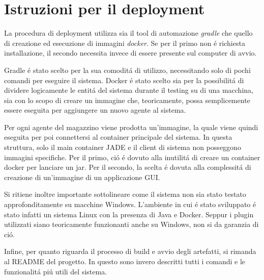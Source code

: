 \section{Istruzioni per il deployment}


La procedura di deployment utilizza sia il tool di automazione \textit{gradle} che quello di creazione ed esecuzione di immagini \textit{docker}. Se per il primo non \'e richiesta installazione, il secondo necessita invece di essere presente sul computer di avvio.

Gradle \'e stato scelto per la sua comodit\'a di utilizzo, necessitando solo di pochi comandi per eseguire il sistema. Docker \'e stato scelto sia per la possibilit\'a di dividere logicamente le entit\'a del sistema durante il testing su di una macchina, sia con lo scopo di creare un immagine che, teoricamente, possa semplicemente essere eseguita per aggiungere un nuovo agente al sistema.

\parag
Per ogni agente del magazzino viene prodotta un'immagine, la quale viene quindi eseguita per poi connettersi al container principale del sistema. In questa struttura, solo il main container JADE e il client di sistema non posseggono immagini specifiche. Per il primo, ci\'o \'e dovuto alla inutilit\'a di creare un container docker per lanciare un jar. Per il secondo, la scelta \'e dovuta alla complessit\'a di creazione di un'immagine di un applicazione GUI.

\parag
Si ritiene inoltre importante sottolineare come il sistema non sia stato testato approfonditamente su macchine Windows. L'ambiente in cui \'e stato sviluppato \'e stato infatti un sistema Linux con la presenza di Java e Docker. Seppur i plugin utilizzati siano teoricamente funzionanti anche su Windows, non si da garanzia di ci\'o.

\parag
Infine, per quanto riguarda il processo di build e avvio degli artefatti, si rimanda al README del progetto. In questo sono invero descritti tutti i comandi e le funzionalit\'a pi\'u utili del sistema.
